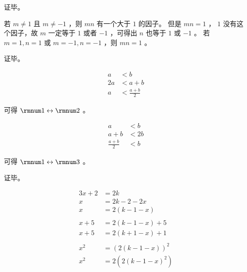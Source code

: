 {{\begin{practices}
            证毕。
        \end{practices}

        \begin{practices}
            若 $m \neq 1$ 且 $m \neq -1$ ，则 $mn$ 有一个大于 $1$ 的因子。
            但是 $mn = 1$ ， $1$ 没有这个因子，故 $m$ 一定等于 $1$ 或者 $-1$ ，可得出 $n$ 也等于 $1$ 或 $-1$ 。
            若 $m = 1, n = 1$ 或 $m = -1, n = -1$ ，则 $mn = 1$ 。

            证毕。
        \end{practices}

        \begin{practices}
            \begin{align*}
                a &< b \\
                2a &< a + b \\
                a &< \frac{a + b}{2}
            \end{align*}

            可得 $\rmnum 1 \leftrightarrow \rmnum 2$ 。

            \begin{align*}
                a &< b \\
                a + b &< 2b \\
                \frac{a + b}{2} &< b
            \end{align*}

            可得 $\rmnum 1 \leftrightarrow \rmnum 3$ 。

            证毕。
        \end{practices}

        \begin{practices}
            \begin{align*}
                3x + 2 &= 2k \\
                x &= 2k - 2 - 2x \\
                x &= 2(k - 1 - x) \\
                \\
                x + 5 &= 2(k - 1 - x) + 5 \\
                x + 5 &= 2(k + 1 - x) + 1 \\
                \\
                x^2 &= (2(k - 1 - x))^2 \\
                x^2 &= 2(2(k - 1 - x)^2) \\
            \end{align*}


\end{practices}}}
